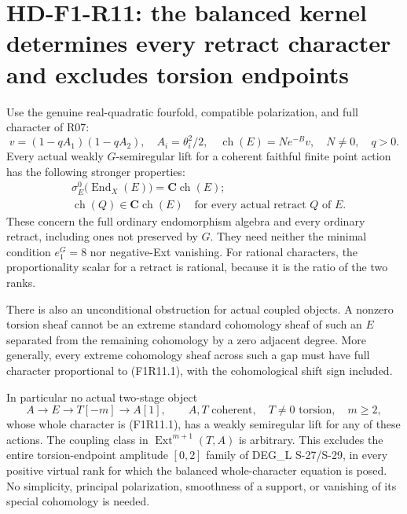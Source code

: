 \section{HD-F1-R11: the balanced kernel determines every retract character and excludes torsion endpoints}
\label{sec:followup-rm-character-rigidity}

Use the genuine real-quadratic fourfold, compatible polarization,
and full character of R07:
\[
 v=(1-qA_1)(1-qA_2),\quad A_i=\theta_i^2/2,\quad
 \operatorname{ch}(E)=N e^{-B}v,\quad N\ne0,\quad q>0.
 \tag{F1R11.1}
\]
Every actual weakly $G$-semiregular lift for a coherent faithful
finite point action has the following stronger properties:
\[
 \begin{split}
 &\sigma_E^0\bigl(\operatorname{End}_X(E)\bigr)
                   =\mathbf C\operatorname{ch}(E);\\
 &\operatorname{ch}(Q)\in\mathbf C\operatorname{ch}(E)
       \quad\text{for every actual retract }Q\text{ of }E.
 \end{split}
 \tag{F1R11.2}
\]
These concern the full ordinary endomorphism algebra and every
ordinary retract, including ones not preserved by $G$. They need
neither the minimal condition $e_1^G=8$ nor negative-Ext vanishing.
For rational characters, the proportionality scalar for a retract
is rational, because it is the ratio of the two ranks.

There is also an unconditional obstruction for actual coupled
objects. A nonzero torsion sheaf cannot be an extreme standard
cohomology sheaf of such an $E$ separated from the remaining
cohomology by a zero adjacent degree. More generally, every
extreme cohomology sheaf across such a gap must have full
character proportional to (F1R11.1), with the cohomological
shift sign included.

In particular no actual two-stage object
\[
 A\longrightarrow E\longrightarrow T[-m]\longrightarrow A[1],
 \qquad A,T\text{ coherent},\quad T\ne0\text{ torsion},\quad m\ge2,
 \tag{F1R11.3}
\]
whose whole character is (F1R11.1), has a weakly semiregular
lift for any of these actions. The coupling class in
$\operatorname{Ext}^{m+1}(T,A)$ is arbitrary. This excludes
the entire torsion-endpoint amplitude $[0,2]$ family of
DEG\_L S-27/S-29, in every positive virtual rank for which
the balanced whole-character equation is posed. No simplicity,
principal polarization, smoothness of a support, or vanishing
of its special cohomology is needed.


